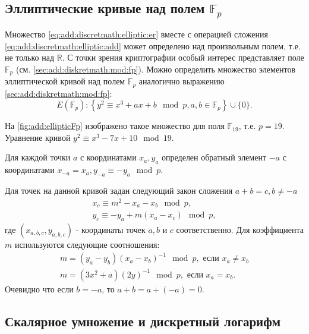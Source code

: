 \subsection{Эллиптические кривые над полем $\mathbb{F}_p$}
Множество \eqref{eq:add:discretmath:elliptic:er} вместе с операцией
сложения \eqref{eq:add:discretmath:elliptic:add} может определено над
произвольным полем, т.е. не только над $\mathbb{R}$. С точки зрения
криптографии особый интерес представляет поле $\mathbb{F}_p$ (см.
\autoref{sec:add:diskretmath:mod:fp}). Можно определить множество
элементов эллиптической кривой над полем $\mathbb{F}_p$ аналогично
выражению \eqref{sec:add:diskretmath:mod:fp}:
\begin{equation}
E\left(\mathbb{F}_p\right) : \left\{
y^2 \equiv x^3 +ax +b \mod p, a,b \in \mathbb{F}_p
\right\} \cup \{0\}.
\label{eq:add:discretmath:elliptic:fp}
\end{equation}



На \autoref{fig:add:ellipticFp} изображено такое множество для поля
$\mathbb{F}_{19}$, т.е. $p = 19$. Уравнение кривой $y^2 \equiv x^3 -7
x + 10 \mod 19$. 

Для каждой точки $a$ с координатами $x_a, y_a$ определен обратный
элемент $-a$ с координатами $x_{-a} = x_a, y_{-a} \equiv -y_a \mod p$.

Для точек на данной кривой задан следующий закон сложения $a + b = c,
b \ne -a$
\begin{eqnarray}
x_{c} \equiv m^2 - x_a - x_b \mod p,
\nonumber \\
y_{c} \equiv - y_a + m \left(x_a - x_c\right) \mod p,
\label{eq:add:discretmath:elliptic:addfp}
\end{eqnarray}
где $(x_{a,b,c}, y_{a,b,c})$ - координаты точек $a,b$ и $c$
соответственно. Для коэффициента $m$ используются следующие
соотношения: 
\begin{eqnarray}
m = \left(y_a - y_b\right)\left(x_a - x_b\right)^{-1} \mod p, \mbox{ если } x_a \ne x_b
\nonumber \\
m = \left(3x^2 + a\right)\left(2y\right)^{-1} \mod p, \mbox{ если }
x_a = x_b.
\nonumber
\end{eqnarray}
Очевидно что если $b = -a$, то $a + b = a + (-a) = 0$.

\subsection{Скалярное умножение и дискретный логарифм}

